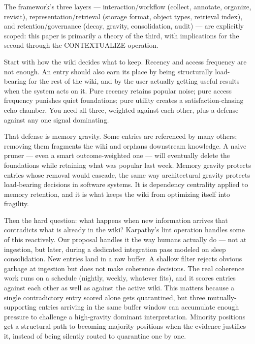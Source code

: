 \documentclass[
  11pt,
]{article}
\begin{document}
The framework's three layers --- interaction/workflow (collect,
annotate, organize, revisit), representation/retrieval (storage format,
object types, retrieval index), and retention/governance (decay,
gravity, consolidation, audit) --- are explicitly scoped: this paper is
primarily a theory of the third, with implications for the second
through the CONTEXTUALIZE operation.

Start with how the wiki decides what to keep. Recency and access
frequency are not enough. An entry should also earn its place by being
structurally load-bearing for the rest of the wiki, and by the user
actually getting useful results when the system acts on it. Pure recency
retains popular noise; pure access frequency punishes quiet foundations;
pure utility creates a satisfaction-chasing echo chamber. You need all
three, weighted against each other, plus a defense against any one
signal dominating.

That defense is memory gravity. Some entries are referenced by many
others; removing them fragments the wiki and orphans downstream
knowledge. A naive pruner --- even a smart outcome-weighted one --- will
eventually delete the foundations while retaining what was popular last
week. Memory gravity protects entries whose removal would cascade, the
same way architectural gravity protects load-bearing decisions in
software systems. It is dependency centrality applied to memory
retention, and it is what keeps the wiki from optimizing itself into
fragility.

Then the hard question: what happens when new information arrives that
contradicts what is already in the wiki? Karpathy's lint operation
handles some of this reactively. Our proposal handles it the way humans
actually do --- not at ingestion, but later, during a dedicated
integration pass modeled on sleep consolidation. New entries land in a
raw buffer. A shallow filter rejects obvious garbage at ingestion but
does not make coherence decisions. The real coherence work runs on a
schedule (nightly, weekly, whatever fits), and it scores entries against
each other as well as against the active wiki. This matters because a
single contradictory entry scored alone gets quarantined, but three
mutually-supporting entries arriving in the same buffer window can
accumulate enough pressure to challenge a high-gravity dominant
interpretation. Minority positions get a structural path to becoming
majority positions when the evidence justifies it, instead of being
silently routed to quarantine one by one.
\end{document}
